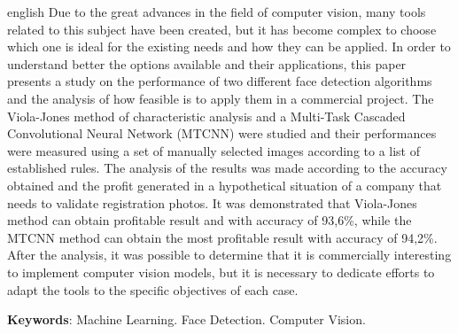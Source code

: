 \begin{resumo}[Abstract]
  \begin{otherlanguage*}{english}
    Due to the great advances in the field of computer vision, many tools related to this subject have been created, but it has become complex to choose which one is ideal for the existing needs and how they can be applied. In order to understand better the options available and their applications, this paper presents a study on the performance of two different face detection algorithms and the analysis of how feasible is to apply them in a commercial project. The Viola-Jones method of characteristic analysis and a Multi-Task Cascaded Convolutional Neural Network (MTCNN) were studied and their performances were measured using a set of manually selected images according to a list of established rules. The analysis of the results was made according to the accuracy obtained and the profit generated in a hypothetical situation of a company that needs to validate registration photos. It was demonstrated that Viola-Jones method can obtain profitable result and with accuracy of 93,6\%, while the MTCNN method can obtain the most profitable result with accuracy of 94,2\%. After the analysis, it was possible to determine that it is commercially interesting to implement computer vision models, but it is necessary to dedicate efforts to adapt the tools to the specific objectives of each case.

    \vspace{\onelineskip}

    \noindent
    \textbf{Keywords}: Machine Learning. Face Detection. Computer Vision.
  \end{otherlanguage*}
\end{resumo}